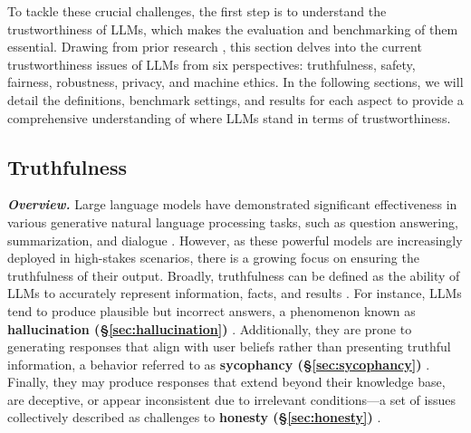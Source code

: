 To tackle these crucial challenges, the first step is to understand the trustworthiness of LLMs, which makes the evaluation and benchmarking of them essential. Drawing from prior research \cite{huang2024position}, this section delves into the current trustworthiness issues of LLMs from six perspectives: truthfulness, safety, fairness, robustness, privacy, and machine ethics. In the following sections, we will detail the definitions, benchmark settings, and results for each aspect to provide a comprehensive understanding of where LLMs stand in terms of trustworthiness.  



\subsection{Truthfulness}
\label{sec:llm_Truthfulness}
\textbf{\textit{Overview.}} Large language models have demonstrated significant effectiveness in various generative natural language processing tasks, such as question answering, summarization, and dialogue \cite{touvron2023llama2, dubey2024llama, achiam2023gpt, team2023gemini}. However, as these powerful models are increasingly deployed in high-stakes scenarios, there is a growing focus on ensuring the truthfulness of their output. Broadly, truthfulness can be defined as the ability of LLMs to accurately represent information, facts, and results \cite{huang2024position}. For instance, LLMs tend to produce plausible but incorrect answers, a phenomenon known as \textbf{hallucination (\S \ref{sec:hallucination})} \cite{ji2023survey, huang2023survey, zhang2023siren}. Additionally, they are prone to generating responses that align with user beliefs rather than presenting truthful information, a behavior referred to as \textbf{sycophancy (\S \ref{sec:sycophancy})} \cite{sharma2023understanding, perez2022discovering, wei2023simple}. Finally, they may produce responses that extend beyond their knowledge base, are deceptive, or appear inconsistent due to irrelevant conditions—a set of issues collectively described as challenges to \textbf{honesty (\S \ref{sec:honesty})} \cite{gao2024best, evans2021truthful, chern2024behonest}.



